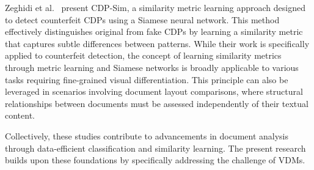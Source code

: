 Zeghidi et al.~\cite{zeghidi2023cdpsim} present CDP-Sim, a similarity metric learning approach designed to detect counterfeit \glspl{CDP} using a Siamese neural network. This method effectively distinguishes original from fake \glspl{CDP} by learning a similarity metric that captures subtle differences between patterns. While their work is specifically applied to counterfeit detection, the concept of learning similarity metrics through metric learning and Siamese networks is broadly applicable to various tasks requiring fine-grained visual differentiation. This principle can also be leveraged in scenarios involving document layout comparisons, where structural relationships between documents must be assessed independently of their textual content.

Collectively, these studies contribute to advancements in document analysis through data-efficient classification and similarity learning. The present research builds upon these foundations by specifically addressing the challenge of \glspl{VDM}.